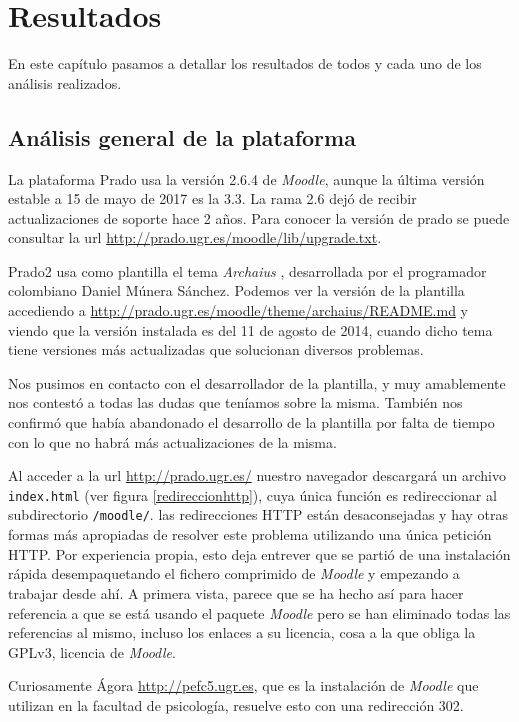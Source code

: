 \chapter{Resultados}

En este capítulo pasamos a detallar los resultados de todos y cada uno de los análisis realizados.

\section{Análisis general de la plataforma}

La plataforma Prado usa la versión 2.6.4 de \textit{Moodle}, aunque la última versión estable a 15 de mayo de 2017 es la 3.3. La rama 2.6 dejó de recibir actualizaciones de soporte hace 2 años. Para conocer la versión de prado se puede consultar la url \url{http://prado.ugr.es/moodle/lib/upgrade.txt}.

\bigskip
Prado2 usa como plantilla el tema \textit{Archaius} \cite{moodletheme}, desarrollada por el programador colombiano Daniel Múnera Sánchez. Podemos ver la versión de la plantilla accediendo a \url{http://prado.ugr.es/moodle/theme/archaius/README.md} y viendo que la versión instalada es del 11 de agosto de 2014, cuando dicho tema tiene versiones más actualizadas que solucionan diversos problemas.

\bigskip
Nos pusimos en contacto con el desarrollador de la plantilla, y muy amablemente nos contestó a todas las dudas que teníamos sobre la misma. También nos confirmó que había abandonado el desarrollo de la plantilla por falta de tiempo con lo que no habrá más actualizaciones de la misma.

\bigskip
Al acceder a la url \url{http://prado.ugr.es/} nuestro navegador descargará un archivo \texttt{index.html} (ver figura \ref{redireccionhttp}), cuya única función es redireccionar al subdirectorio \texttt{/moodle/}. las redirecciones HTTP están desaconsejadas y hay otras formas más apropiadas de resolver este problema utilizando una única petición HTTP. Por experiencia propia, esto deja entrever que se partió de una instalación rápida desempaquetando el fichero comprimido de \textit{Moodle} y empezando a trabajar desde ahí. A primera vista, parece que se ha hecho así para hacer referencia a que se está usando el paquete \textit{Moodle} pero se han eliminado todas las referencias al mismo, incluso los enlaces a su licencia, cosa a la que obliga la GPLv3, licencia de \textit{Moodle}.

\bigskip
Curiosamente Ágora \url{http://pefc5.ugr.es}, que es la instalación de \textit{Moodle} que utilizan en la facultad de psicología, resuelve esto con una redirección 302.

